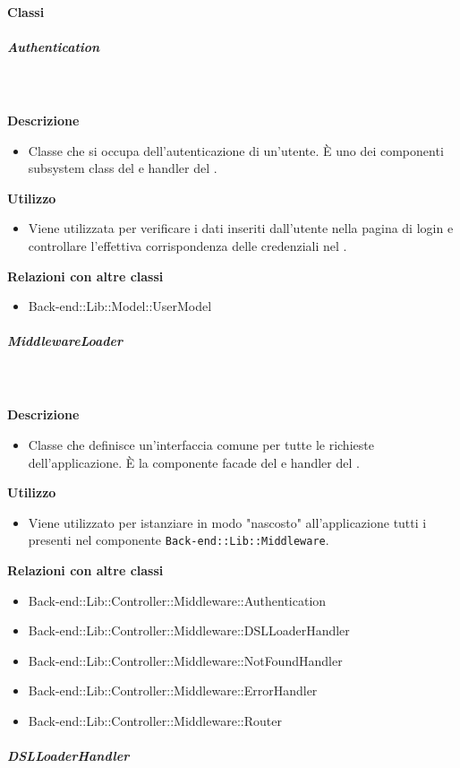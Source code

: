 		\paragraph{Classi}
			\subparagraph{Authentication}
				
				\textbf{\\ \\ Descrizione} 
					\begin{itemize}
						\item[] Classe che si occupa dell'autenticazione di un'utente. È uno dei componenti subsystem class del   e handler del  .
					\end{itemize}      
				\textbf{Utilizzo}  
					\begin{itemize}
						\item[] Viene utilizzata per verificare i dati inseriti dall'utente nella pagina di login e controllare l'effettiva corrispondenza delle credenziali nel .
					\end{itemize}
					\textbf{Relazioni con altre classi}
					\begin{itemize}
							\item{Back-end::Lib::Model::UserModel}
					\end{itemize}
			\subparagraph{MiddlewareLoader}
				
				\textbf{\\ \\ Descrizione} 
					\begin{itemize}
						\item[] Classe che definisce un'interfaccia comune per tutte le richieste dell'applicazione. È la componente facade del   e handler del  .
					\end{itemize}      
				\textbf{Utilizzo}  
					\begin{itemize}
						\item[] Viene utilizzato per istanziare in modo "nascosto" all'applicazione tutti i  presenti nel componente \texttt{Back-end::Lib::Middleware}.
					\end{itemize}
					\textbf{Relazioni con altre classi}
					\begin{itemize}
							\item{Back-end::Lib::Controller::Middleware::Authentication}
							\item{Back-end::Lib::Controller::Middleware::DSLLoaderHandler}
							\item{Back-end::Lib::Controller::Middleware::NotFoundHandler}
							\item{Back-end::Lib::Controller::Middleware::ErrorHandler}
							\item{Back-end::Lib::Controller::Middleware::Router}
					\end{itemize}
			\subparagraph{DSLLoaderHandler}
				
